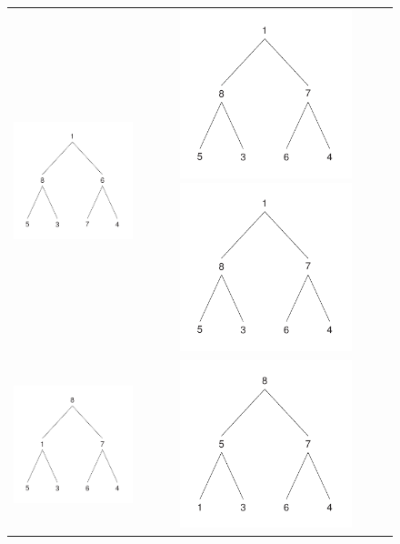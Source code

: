 \documentclass{article}
\begin{document}
\begin{figure}[H]
  \begin{tabular}{cc}
    \includegraphics[width=50mm]{1}&
    \includegraphics[width=50mm]{2}
    \includegraphics[width=50mm]{3}\\
    \includegraphics[width=50mm]{4}&
    \includegraphics[width=50mm]{5}\\
  \end{tabular}
\end{figure}
\end{document}
